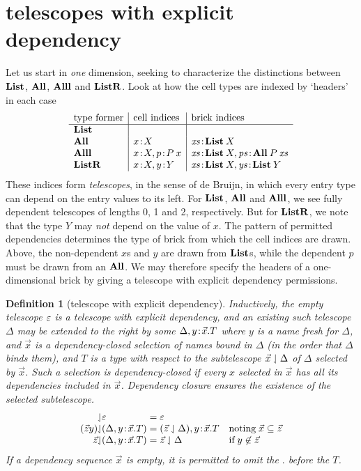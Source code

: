 \documentclass{article}
\newtheorem{defn}[thm]{Definition}
\begin{document}
\section{telescopes with explicit dependency}

Let us start in \emph{one} dimension, seeking to characterize the distinctions between $\mathbf{List}$, $\mathbf{All}$, $\mathbf{Alll}$ and $\mathbf{ListR}$. Look at how the cell types are indexed by `headers' in each case
\[\begin{array}{l|l|l}
\mbox{type former} & \mbox{cell indices} & \mbox{brick indices}\\
\hline
\Li & & \\
\All & x\hb X & \xs\hb\Li\:X\\
\Alll & x\hb X, p\hb P\:x & \xs\hb\Li\:X, \ps\hb\All\:P\:\xs\\
\ListR & x\hb X, y\hb Y & \xs\hb\Li\:X, \ys\hb\Li\:Y\\
\end{array}\]
These indices form \emph{telescopes}, in the sense of de Bruijn, in which every entry type can depend on the entry values to its left. For $\mathbf{List}$, $\mathbf{All}$ and $\mathbf{Alll}$, we see fully dependent telescopes of lengths 0, 1 and 2, respectively. But for $\mathbf{ListR}$, we note that the type $Y$ may \emph{not} depend on the value of $x$. The pattern of permitted dependencies determines the type of brick from which the cell indices are drawn. Above, the non-dependent $x$s and $y$ are drawn from $\mathbf{List}$s, while the dependent $p$ must be drawn from an $\mathbf{All}$. We may therefore specify the headers of a one-dimensional brick by giving a telescope with explicit dependency permissions.

\begin{defn}[telescope with explicit dependency]
  Inductively, the empty telescope $\varepsilon$ is a telescope with explicit dependency, and an existing such telescope $\Delta$ may be extended to the right by some $\Delta,y\!:\!\vec x.T$ where $y$ is a name fresh for $\Delta$, and $\vec x$ is a dependency-closed selection of names bound in $\Delta$ (in the order that $\Delta$ binds them), and $T$ is a type with respect to the subtelescope $\vec x\downharpoonleft\Delta$ of $\Delta$ selected by $\vec x$. Such a selection is dependency-closed if every $x$ selected in $\vec x$ has all its dependencies included in $\vec x$. Dependency closure ensures the existence of the selected subtelescope.
  \[
  \begin{array}{r@{\sel}l@{\;=\;}ll}
    \;&\emp & \emp \\
    (\vec z y)&(\Delta,y\hb\vec x.T) & (\vec z\sel\Delta),y\hb\vec x.T
    &\mbox{noting}\;\vec x \subseteq \vec z\\
    \vec z&(\Delta,y\hb\vec x.T) & \vec z\sel\Delta &\mbox{if}\;y\not\in \vec z \\
    \end{array}
  \]
If a dependency sequence $\vec x$ is empty, it is permitted to omit the $.$ before the $T$.
\end{defn}
\end{document}
